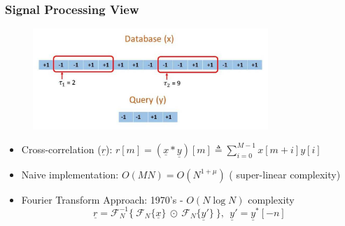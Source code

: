 \documentclass[10pt,xcolor=table]{beamer}
\newcommand{\defeq}{\triangleq}
\newcommand{\xv}{\underline{x}}
\newcommand{\yv}{\underline{y}}
\newcommand{\rv}{\underline{r}}
\begin{document}
\begin{frame}\frametitle{Signal Processing View}

	\begin{figure}[t]
		\centering
		\includegraphics[width=3.5in]{Pattern_matching_ex.pdf}
	\end{figure}

			\begin{block}{}			
				\begin{itemize}
					\item {Cross-correlation} ($\rv$): $\displaystyle{r[m]=(\xv*\yv)[m] \defeq \sum_{i=0}^{M-1} x[m+i] y[i] }$
			        \pause
					\item {Naive implementation}: $O(MN) = O(N^{1+\mu})$ ({\color{blue} super-linear} complexity)
                    \pause
					\item {Fourier Transform Approach}: 1970's - $O(N \log N)$ complexity
					\begin{equation}\nonumber
					\rv = \mathcal{F}_{N}^{-1} \{~  \mathcal{F}_{N}\{\xv\} ~ \odot ~  \mathcal{F}_{N}\{\yv'\} ~ \}, \ \ \yv' = \yv^{*}[-n]
					\end{equation}
					
				\end{itemize}
			\end{block}												
\end{frame}
\end{document}
